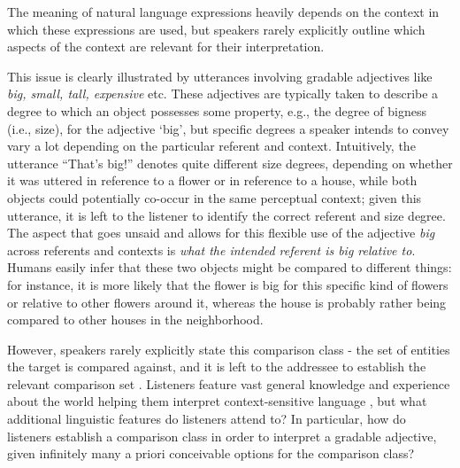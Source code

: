 The meaning of natural language expressions heavily depends on the context in which these expressions are used, but speakers rarely explicitly outline which aspects of the context are relevant for their interpretation. 

This issue is clearly illustrated by utterances involving gradable adjectives like \textit{big, small, tall, expensive} etc. These adjectives are typically taken to describe a degree to which an object possesses some property, e.g., the degree of bigness (i.e., size), for the adjective ‘big’, but specific degrees a speaker intends to convey vary a lot depending on the particular referent and context. Intuitively, the utterance “That’s big!” denotes quite different size degrees, depending on whether it was uttered in reference to a flower or in reference to a house, while both objects could potentially co-occur in the same perceptual context; given this utterance, it is left to the listener to identify the correct referent and size degree. The aspect that goes unsaid and allows for this flexible use of the adjective \textit{big} across referents and contexts is \textit{what the intended referent is big relative to}. Humans easily infer that these two objects might be compared to different things: for instance, it is more likely that the flower is big for this specific kind of flowers or relative to other flowers around it, whereas the house is probably rather being compared to other houses in the neighborhood. 

However, speakers rarely explicitly state this comparison class - the set of entities the target is compared against, and it is left to the addressee to establish the relevant comparison set \parencite{Solt2009}. Listeners feature vast general knowledge and experience about the world helping them interpret context-sensitive language \parencite{tessler2017warm}, but what additional linguistic features do listeners attend to? In particular, how do listeners establish a comparison class in order to interpret a gradable adjective, given infinitely many a priori conceivable options for the comparison class? 

